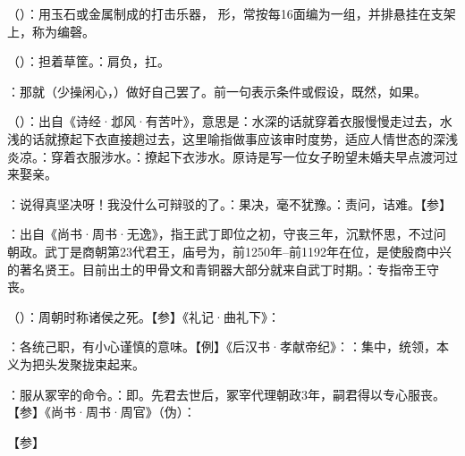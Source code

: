 {
\item {}（）：用玉石或金属制成的打击乐器， 形，常按每16面编为一组，并排悬挂在支架上，称为编磬。
\item {}（）：担着草筐。：肩负，扛。
\item {}：那就（少操闲心，）做好自己罢了。前一句表示条件或假设，既然，如果。
\item {}（）：出自《诗经·邶风·有苦叶》，意思是：水深的话就穿着衣服慢慢走过去，水浅的话就撩起下衣直接趟过去，这里喻指做事应该审时度势，适应人情世态的深浅炎凉。：穿着衣服涉水。：撩起下衣涉水。原诗是写一位女子盼望未婚夫早点渡河过来娶亲。
\item {}：说得真坚决呀！我没什么可辩驳的了。：果决，毫不犹豫。：责问，诘难。【参】
}
{}  %


{
\item {}：出自《尚书·周书·无逸》，指王武丁即位之初，守丧三年，沉默怀思，不过问朝政。武丁是商朝第23代君王，庙号为，前1250年--前1192年在位，是使殷商中兴的著名贤王。目前出土的甲骨文和青铜器大部分就来自武丁时期。：专指帝王守丧。
\item {}（）：周朝时称诸侯之死。【参】《礼记·曲礼下》：
\item {}：各统己职，有小心谨慎的意味。【例】《后汉书·孝献帝纪》：：集中，统领，本义为把头发聚拢束起来。
\item {}：服从冢宰的命令。：即。先君去世后，冢宰代理朝政3年，嗣君得以专心服丧。【参】《尚书·周书·周官》（伪）：
}
{}


{【参】}
{}



